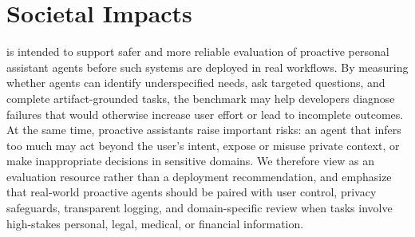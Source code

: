 
\section{Societal Impacts}
\label{app:societal_impacts}

{\bench} is intended to support safer and more reliable evaluation of proactive personal assistant agents before such systems are deployed in real workflows. By measuring whether agents can identify underspecified needs, ask targeted questions, and complete artifact-grounded tasks, the benchmark may help developers diagnose failures that would otherwise increase user effort or lead to incomplete outcomes. At the same time, proactive assistants raise important risks: an agent that infers too much may act beyond the user's intent, expose or misuse private context, or make inappropriate decisions in sensitive domains. We therefore view {\bench} as an evaluation resource rather than a deployment recommendation, and emphasize that real-world proactive agents should be paired with user control, privacy safeguards, transparent logging, and domain-specific review when tasks involve high-stakes personal, legal, medical, or financial information.
